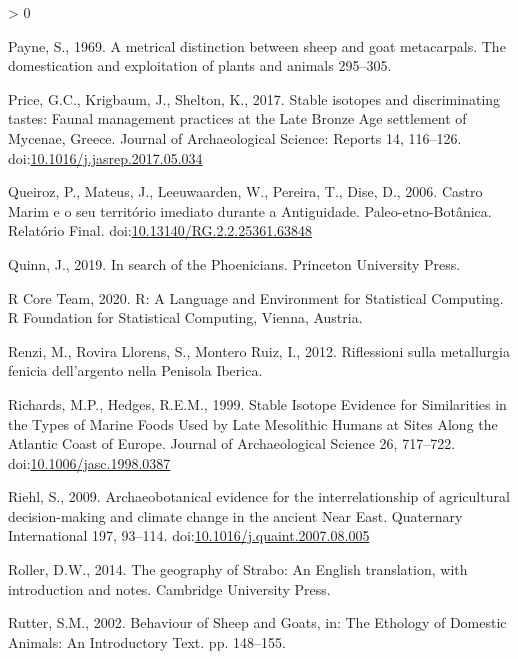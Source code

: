 \documentclass[5p]{elsarticle} %
\newlength{\cslhangindent}
\newenvironment{CSLReferences}[2] %
 {%
  \setlength{\parindent}{0pt}
  \ifodd #1 \everypar{\setlength{\hangindent}{\cslhangindent}}\ignorespaces\fi
  \ifnum #2 > 0
  \setlength{\parskip}{#2\baselineskip}
  \fi
 }%
 {}
\begin{document}
\begin{CSLReferences}{1}{0}
\leavevmode\hypertarget{ref-payne69}{}%
Payne, S., 1969. A metrical distinction between sheep and goat metacarpals. The domestication and exploitation of plants and animals 295--305.

\leavevmode\hypertarget{ref-price_etal17}{}%
Price, G.C., Krigbaum, J., Shelton, K., 2017. Stable isotopes and discriminating tastes: {Faunal} management practices at the {Late Bronze Age} settlement of {Mycenae}, {Greece}. Journal of Archaeological Science: Reports 14, 116--126. doi:\href{https://doi.org/10.1016/j.jasrep.2017.05.034}{10.1016/j.jasrep.2017.05.034}

\leavevmode\hypertarget{ref-queiroz_etal06}{}%
Queiroz, P., Mateus, J., Leeuwaarden, W., Pereira, T., Dise, D., 2006. Castro {Marim} e o seu território imediato durante a {Antiguidade}. {Paleo}-etno-{Botânica}. {Relatório Final}. doi:\href{https://doi.org/10.13140/RG.2.2.25361.63848}{10.13140/RG.2.2.25361.63848}

\leavevmode\hypertarget{ref-quinn19}{}%
Quinn, J., 2019. In search of the {Phoenicians}. {Princeton University Press}.

\leavevmode\hypertarget{ref-rcoreteam20}{}%
R Core Team, 2020. R: {A Language} and {Environment} for {Statistical Computing}. {R Foundation for Statistical Computing}, {Vienna, Austria}.

\leavevmode\hypertarget{ref-renzi_etal12}{}%
Renzi, M., Rovira Llorens, S., Montero Ruiz, I., 2012. Riflessioni sulla metallurgia fenicia dell'argento nella {Penisola Iberica}.

\leavevmode\hypertarget{ref-richards_hedges99}{}%
Richards, M.P., Hedges, R.E.M., 1999. Stable {Isotope Evidence} for {Similarities} in the {Types} of {Marine Foods Used} by {Late Mesolithic Humans} at {Sites Along} the {Atlantic Coast} of {Europe}. Journal of Archaeological Science 26, 717--722. doi:\href{https://doi.org/10.1006/jasc.1998.0387}{10.1006/jasc.1998.0387}

\leavevmode\hypertarget{ref-riehl09}{}%
Riehl, S., 2009. Archaeobotanical evidence for the interrelationship of agricultural decision-making and climate change in the ancient {Near East}. Quaternary International 197, 93--114. doi:\href{https://doi.org/10.1016/j.quaint.2007.08.005}{10.1016/j.quaint.2007.08.005}

\leavevmode\hypertarget{ref-roller14}{}%
Roller, D.W., 2014. The geography of {Strabo}: {An English} translation, with introduction and notes. {Cambridge University Press}.

\leavevmode\hypertarget{ref-rutter02}{}%
Rutter, S.M., 2002. Behaviour of {Sheep} and {Goats}, in: The Ethology of Domestic Animals: {An} Introductory Text. pp. 148--155.


\end{CSLReferences}
\end{document}
